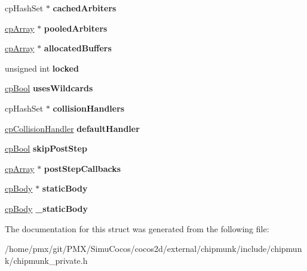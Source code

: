 \begin{DoxyCompactItemize}
\mbox{\label{structcpSpace_a06b170d917337866c13d11172a572715}} 
cp\+Hash\+Set $\ast$ {\bfseries cached\+Arbiters}
\item 
\mbox{\label{structcpSpace_aaadf854099bddbde255729d7d15c7743}} 
\hyperlink{structcpArray}{cp\+Array} $\ast$ {\bfseries pooled\+Arbiters}
\item 
\mbox{\label{structcpSpace_a9d8678f4692758ca58ed23edec9667a9}} 
\hyperlink{structcpArray}{cp\+Array} $\ast$ {\bfseries allocated\+Buffers}
\item 
\mbox{\label{structcpSpace_aad32581cd9bac9f485e4910e8a2256e9}} 
unsigned int {\bfseries locked}
\item 
\mbox{\label{structcpSpace_af91f836d9c1614ea43ba9ac507535be9}} 
\hyperlink{group__basicTypes_gabc5e752c48f3449ca26ef413ecbd647e}{cp\+Bool} {\bfseries uses\+Wildcards}
\item 
\mbox{\label{structcpSpace_a54a142f03098d2947070356295e031ee}} 
cp\+Hash\+Set $\ast$ {\bfseries collision\+Handlers}
\item 
\mbox{\label{structcpSpace_a6c58059b9576001c8a18c11fb9b231c4}} 
\hyperlink{structcpCollisionHandler}{cp\+Collision\+Handler} {\bfseries default\+Handler}
\item 
\mbox{\label{structcpSpace_a4b82b21459a5bee3aaef8df4c3f131fd}} 
\hyperlink{group__basicTypes_gabc5e752c48f3449ca26ef413ecbd647e}{cp\+Bool} {\bfseries skip\+Post\+Step}
\item 
\mbox{\label{structcpSpace_af84ce5d2c922738888d58eb26f8f073c}} 
\hyperlink{structcpArray}{cp\+Array} $\ast$ {\bfseries post\+Step\+Callbacks}
\item 
\mbox{\label{structcpSpace_a615474e85d7947ebfe473dd136310e60}} 
\hyperlink{structcpBody}{cp\+Body} $\ast$ {\bfseries static\+Body}
\item 
\mbox{\label{structcpSpace_a9ef6a6fa6948d39ec8075af0daa452cd}} 
\hyperlink{structcpBody}{cp\+Body} {\bfseries \+\_\+static\+Body}
\end{DoxyCompactItemize}


The documentation for this struct was generated from the following file\+:\begin{DoxyCompactItemize}
\item 
/home/pmx/git/\+P\+M\+X/\+Simu\+Cocos/cocos2d/external/chipmunk/include/chipmunk/chipmunk\+\_\+private.\+h\end{DoxyCompactItemize}
